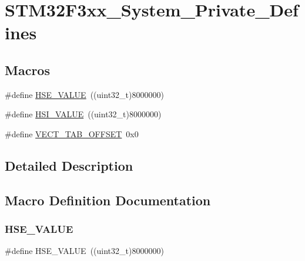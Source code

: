 \hypertarget{group___s_t_m32_f3xx___system___private___defines}{}\section{S\+T\+M32\+F3xx\+\_\+\+System\+\_\+\+Private\+\_\+\+Defines}
\label{group___s_t_m32_f3xx___system___private___defines}
\subsection*{Macros}
\begin{DoxyCompactItemize}
\item 
\#define \mbox{\hyperlink{group___s_t_m32_f3xx___system___private___defines_gaeafcff4f57440c60e64812dddd13e7cb}{H\+S\+E\+\_\+\+V\+A\+L\+UE}}~((uint32\+\_\+t)8000000)
\item 
\#define \mbox{\hyperlink{group___s_t_m32_f3xx___system___private___defines_gaaa8c76e274d0f6dd2cefb5d0b17fbc37}{H\+S\+I\+\_\+\+V\+A\+L\+UE}}~((uint32\+\_\+t)8000000)
\item 
\#define \mbox{\hyperlink{group___s_t_m32_f3xx___system___private___defines_ga40e1495541cbb4acbe3f1819bd87a9fe}{V\+E\+C\+T\+\_\+\+T\+A\+B\+\_\+\+O\+F\+F\+S\+ET}}~0x0
\end{DoxyCompactItemize}


\subsection{Detailed Description}


\subsection{Macro Definition Documentation}
\mbox{\label{group___s_t_m32_f3xx___system___private___defines_gaeafcff4f57440c60e64812dddd13e7cb}} 
\subsubsection{\texorpdfstring{HSE\_VALUE}{HSE\_VALUE}}
{\footnotesize\ttfamily \#define H\+S\+E\+\_\+\+V\+A\+L\+UE~((uint32\+\_\+t)8000000)}

